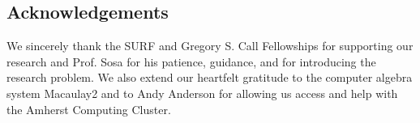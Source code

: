 \documentclass[a0, landscape]{a0poster}
\begin{document}
\begin{multicols}{4}
\section*{\color{DarkSlateBlue}Acknowledgements}

We sincerely thank the SURF and Gregory S. Call Fellowships for supporting our research and Prof. Sosa for his patience, guidance, and for introducing the research problem. We also extend our heartfelt gratitude to the computer algebra system Macaulay2 and to Andy Anderson for allowing us access and help with the Amherst Computing Cluster. 

\color{DarkSlateBlue}










\end{multicols}
\end{document}
